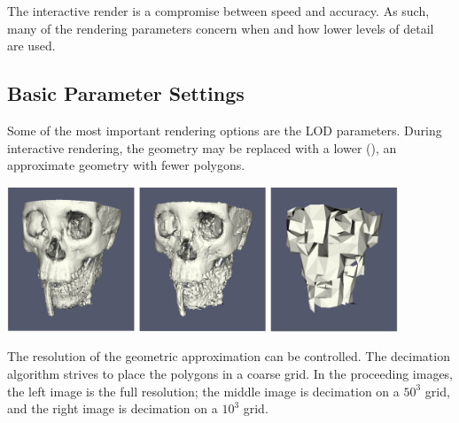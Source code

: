 The interactive render is a compromise between speed and accuracy.  As
such, many of the rendering parameters concern when and how lower levels of
detail are used.

\subsection{Basic Parameter Settings}

Some of the most important rendering options are the LOD parameters.
During interactive rendering, the geometry may be replaced with a lower
 (), an approximate geometry with
fewer polygons.

\begin{inlinefig}
  \includegraphics[width=1.5in]{images/GeometricLODFull}
  \includegraphics[width=1.5in]{images/GeometricLOD50}
  \includegraphics[width=1.5in]{images/GeometricLOD10}
\end{inlinefig}

The resolution of the geometric approximation can be controlled.  The
decimation algorithm strives to place the polygons in a coarse grid.  In
the proceeding images, the left image is the full resolution; the middle
image is decimation on a $50^3$ grid, and the right image is decimation on
a $10^3$ grid.

